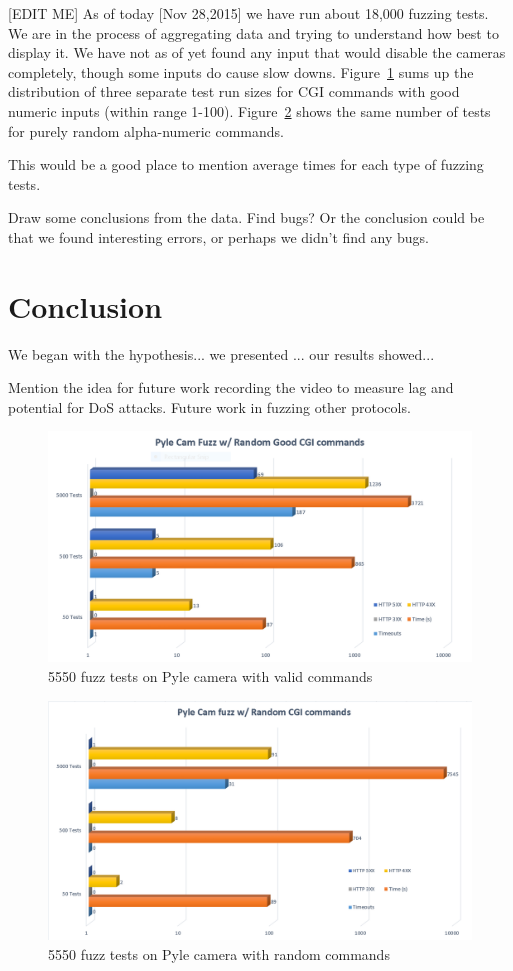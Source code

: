 \documentclass[letterpaper,twocolumn,10pt]{article}
\begin{document}
[EDIT ME]
As of today [Nov 28,2015] we have run about 18,000 fuzzing tests. We are in the process of aggregating data and trying to understand how best to display it. We have not as of yet found any input that would disable the cameras completely, though some inputs do cause slow downs. Figure~\ref{fig:Pyle_Good_CGI} sums up the distribution of three separate test run sizes for CGI commands with good numeric inputs (within range 1-100). Figure~\ref{fig:Pyle_Rand_CGI} shows the same number of tests for purely random alpha-numeric commands.


This would be a good place to mention average times for each type of fuzzing tests. 

Draw some conclusions from the data. Find bugs? Or the conclusion could be that we found interesting errors, or perhaps we didn't find any bugs. 

\section{Conclusion}
We began with the hypothesis... we presented ... our results showed...

Mention the idea for future work recording the video to measure lag and potential for DoS attacks. Future work in fuzzing other protocols. 

\begin{figure}
\centering
\includegraphics[width=0.9\linewidth]{Pyle_Good_CGI}
\caption{ 5550 fuzz tests on Pyle camera with valid commands}
\label{fig:Pyle_Good_CGI}
\end{figure}

\begin{figure}
\centering
\includegraphics[width=0.9\linewidth]{Pyle_Rand_CGI}
\caption{5550 fuzz tests on Pyle camera with random commands}
\label{fig:Pyle_Rand_CGI}
\end{figure}





{\footnotesize 
}
\end{document}
